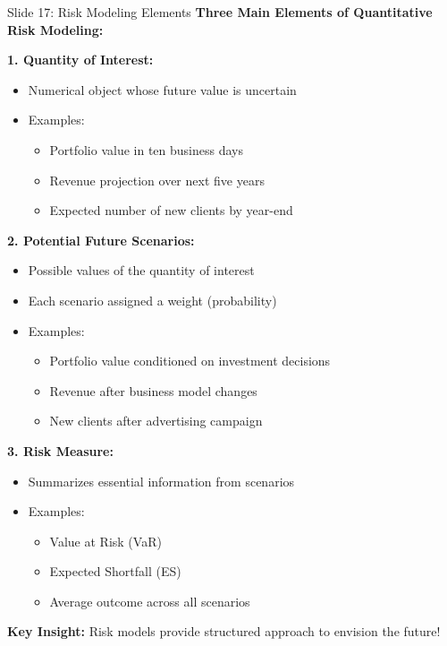 \documentclass[8pt]{beamer}
\begin{document}
	\begin{frame}{Slide 17: Risk Modeling Elements}
		\fontsize{6.5}{7.5}\selectfont
		\textbf{Three Main Elements of Quantitative Risk Modeling:}
		
		\vspace{0.1cm}
		\textbf{1. Quantity of Interest:}
		\begin{itemize}
			\item Numerical object whose future value is uncertain
			\item Examples:
			\begin{itemize}
				\item Portfolio value in ten business days
				\item Revenue projection over next five years
				\item Expected number of new clients by year-end
			\end{itemize}
		\end{itemize}
		
		\vspace{0.1cm}
		\textbf{2. Potential Future Scenarios:}
		\begin{itemize}
			\item Possible values of the quantity of interest
			\item Each scenario assigned a weight (probability)
			\item Examples:
			\begin{itemize}
				\item Portfolio value conditioned on investment decisions
				\item Revenue after business model changes
				\item New clients after advertising campaign
			\end{itemize}
		\end{itemize}
		
		\vspace{0.1cm}
		\textbf{3. Risk Measure:}
		\begin{itemize}
			\item Summarizes essential information from scenarios
			\item Examples:
			\begin{itemize}
				\item Value at Risk (VaR)
				\item Expected Shortfall (ES)
				\item Average outcome across all scenarios
			\end{itemize}
		\end{itemize}
		
		\textcolor{myblue}{\textbf{Key Insight:}} Risk models provide \textcolor{myblue}{structured approach to envision the future}!
	\end{frame}
	
\end{document}
